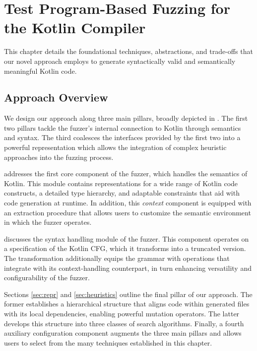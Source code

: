 \chapter{\label{cha:algorithm} Test Program-Based Fuzzing for the Kotlin Compiler}

This chapter details the foundational techniques, abstractions,
and trade-offs that our novel approach employs to generate syntactically
valid and semantically meaningful Kotlin code.
\section{\label{sec:approachoverview}Approach Overview}

We design our approach along three main pillars, broadly depicted in .
The first two pillars tackle the fuzzer's internal connection to Kotlin
through semantics and syntax.
The third coalesces the interfaces provided by the first two
into a powerful representation which allows the integration of complex
heuristic approaches into the fuzzing process.

 addresses the first core component of the fuzzer,
which  handles the semantics of Kotlin.
This module contains representations for a wide range
of Kotlin code constructs, a detailed type hierarchy, and
adaptable constraints that aid with code generation at runtime.
In addition, this \textit{context} component is equipped with
an extraction procedure that allows users to customize
the semantic environment in which the fuzzer operates.

 discusses the syntax handling module of the fuzzer.
This component operates on a specification of the Kotlin \gls{CFG},
which it transforms into a truncated version.
The transformation additionally equips the grammar with
operations that integrate with its context-handling counterpart,
in turn enhancing versatility and configurability of the fuzzer.

Sections \ref{sec:repr} and \ref{sec:heuristics} outline the final pillar
of our approach.
The former establishes a hierarchical structure that aligns code
within generated files with its local dependencies, enabling
powerful mutation operators.
The latter develops this structure into three classes of
search algorithms.
Finally, a fourth auxiliary configuration component
augments the three main pillars and allows users
to select from the many techniques established in this chapter.

